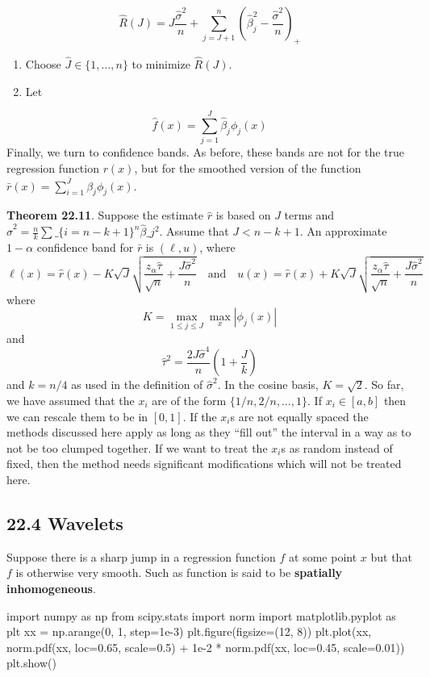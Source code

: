 \[
\hat{R}(J) = J \frac{\hat{\sigma}^{2}}{n} + \sum_{j=J+1}^{n} \left(\hat{\beta}_{j}^{2} - \frac{\hat{\sigma}^{2}}{n} \right)_{+}
\]
\begin{enumerate}
\def\labelenumi{\arabic{enumi}.}
\setcounter{enumi}{3}
\item
  Choose \(\hat{J} \in \{1, \dots, n \}\) to minimize \(\hat{R}(J)\).
\item
  Let
\end{enumerate}
\[
\hat{f}(x) = \sum_{j=1}^J \hat{\beta}_{j} \phi_{j}(x)
\]
Finally, we turn to confidence bands. As before, these bands are not for the true regression function \(r(x)\), but for the smoothed version of the function
\(\bar{r}(x) = \sum_{i=1}^{\bar{J}} \beta_{j} \phi_{j}(x)\).

\textbf{Theorem 22.11}. Suppose the estimate \(\hat{r}\) is based on
\(J\) terms and $\hat{\sigma}^{2} = \frac{n}{k} \sum\_\{i=n-k+1\}^{n}
\hat{\beta}\_{j}^{2} $. Assume that \(J < n - k + 1\). An approximate
\(1 - \alpha\) confidence band for \(\bar{r}\) is \((\ell, u)\),
where
\[
\ell(x) = \hat{r}(x) - K \sqrt{J} \sqrt{\frac{z_{\alpha} \hat{\tau}}{\sqrt{n}} + \frac{J \hat{\sigma}^{2}}{n}}
\quad \text{and} \quad u(x) = \hat{r}(x) + K \sqrt{J} \sqrt{\frac{z_{\alpha} \hat{\tau}}{\sqrt{n}} + \frac{J \hat{\sigma}^{2}}{n}}
\]
where
\[
K = \max_{1 \leq j \leq J} \max_x | \phi_{j}(x) |
\]
and
\[
\hat{\tau}^{2} = \frac{2 J \hat{\sigma}^{4}}{n} \left( 1 + \frac{J}{k} \right)
\]
and \(k = n / 4\) as used in the definition of \(\hat{\sigma}^{2}\). In
the cosine basis, \(K = \sqrt{2}\).
So far, we have assumed that the \(x_{i}\) are of the form
\(\{1/n, 2/n, \dots, 1\}\). If \(x_{i} \in [a, b]\) then we can rescale
them to be in \([0, 1]\). If the \(x_{i}\)s are not equally spaced the
methods discussed here apply as long as they ``fill out'' the interval
in a way as to not be too clumped together. If we want to treat the
\(x_{i}\)s as random instead of fixed, then the method needs significant
modifications which will not be treated here.

\subsection*{22.4 Wavelets}\label{wavelets}
Suppose there is a sharp jump in a regression function \(f\) at some
point \(x\) but that \(f\) is otherwise very smooth. Such as function is
said to be \textbf{spatially inhomogeneous}.

\begin{python}
import numpy as np
from scipy.stats import norm
import matplotlib.pyplot as plt
xx = np.arange(0, 1, step=1e-3)
plt.figure(figsize=(12, 8))
plt.plot(xx, norm.pdf(xx, loc=0.65, scale=0.5) + 1e-2 * norm.pdf(xx, loc=0.45, scale=0.01))
plt.show()
\end{python}

